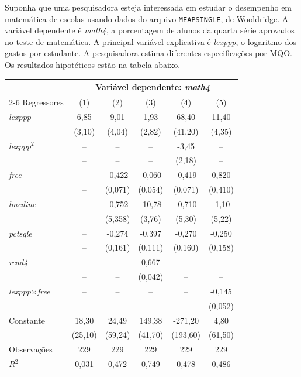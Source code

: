 \documentclass[12pt,letterpaper,onecolumn]{exam}
\begin{document}
\begin{questions}
Suponha que uma pesquisadora esteja interessada em estudar o desempenho em matemática de escolas usando dados do arquivo \texttt{MEAPSINGLE}, de Wooldridge. A variável dependente é \textit{math4}, a porcentagem de alunos da quarta série aprovados no teste de matemática. A principal variável explicativa é \textit{lexppp}, o logaritmo dos gastos por estudante. A pesquisadora estima diferentes especificações por MQO. Os resultados hipotéticos estão na tabela abaixo.

\begin{center}
\small
\begin{tabular}{lccccc}
\toprule
& \multicolumn{5}{c}{Variável dependente: \textit{math4}} \\
\cmidrule(lr){2-6}
Regressores & (1) & (2) & (3) & (4) & (5) \\
\midrule
\textit{lexppp} & 6{,}85 & 9{,}01 & 1{,}93 & 68{,}40 & 11{,}40 \\
& (3{,}10) & (4{,}04) & (2{,}82) & (41{,}20) & (4{,}35) \\[0.15cm]
\textit{lexppp}\(^2\) & -- & -- & -- & -3{,}45 & -- \\
& -- & -- & -- & (2{,}18) & -- \\[0.15cm]
\textit{free} & -- & -0{,}422 & -0{,}060 & -0{,}419 & 0{,}820 \\
& -- & (0{,}071) & (0{,}054) & (0{,}071) & (0{,}410) \\[0.15cm]
\textit{lmedinc} & -- & -0{,}752 & -10{,}78 & -0{,}710 & -1{,}10 \\
& -- & (5{,}358) & (3{,}76) & (5{,}30) & (5{,}22) \\[0.15cm]
\textit{pctsgle} & -- & -0{,}274 & -0{,}397 & -0{,}270 & -0{,}250 \\
& -- & (0{,}161) & (0{,}111) & (0{,}160) & (0{,}158) \\[0.15cm]
\textit{read4} & -- & -- & 0{,}667 & -- & -- \\
& -- & -- & (0{,}042) & -- & -- \\[0.15cm]
\textit{lexppp}\(\times\)\textit{free} & -- & -- & -- & -- & -0{,}145 \\
& -- & -- & -- & -- & (0{,}052) \\[0.15cm]
Constante & 18{,}30 & 24{,}49 & 149{,}38 & -271{,}20 & 4{,}80 \\
& (25{,}10) & (59{,}24) & (41{,}70) & (193{,}60) & (61{,}50) \\
\midrule
Observações & 229 & 229 & 229 & 229 & 229 \\
\(R^2\) & 0{,}031 & 0{,}472 & 0{,}749 & 0{,}478 & 0{,}486 \\
\bottomrule
\end{tabular}
\end{center}


\end{questions}
\end{document}
